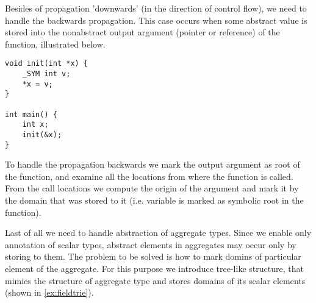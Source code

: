Besides of propagation 'downwards' (in the direction of control flow), we need
to handle the backwards propagation. This case occurs when some abstract value is
stored into the nonabstract output argument (pointer or reference) of the function,
illustrated below.

\begin{verbatim}
void init(int *x) {
    _SYM int v;
    *x = v;
}

int main() {
    int x;
    init(&x);
}

\end{verbatim}

To handle the propagation backwards we mark the output argument as root of the
function, and examine all the locations from where the function is called. From
the call locations we compute the origin of the argument and mark it by the
domain that was stored to it (i.e. variable  is marked as symbolic root
in the  function).

Last of all we need to handle abstraction of aggregate types. Since we enable
only annotation of scalar types, abstract elements in aggregates may occur
only by storing to them. The problem to be solved is how to mark domins of
particular element of the aggregate. For this purpose we introduce tree-like
structure, that mimics the structure of aggregate type and stores domains of
its scalar elements (shown in \autoref{ex:fieldtrie}).

